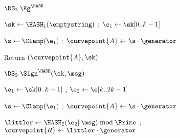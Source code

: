 \begin{figure}
{%
	\begin{algorithm-initial}{$\DS_2.\Kg^{\HASH}$}
		\item $\sk\gets  \HASH_1(\emptystring)$ 
		; $\e_1 \gets \sk[0..k-1]$ 
		\item $\s \gets \Clamp(\e_1)$ ; $\curvepoint{A} \gets \s\cdot \generator$
		\item Return $(\curvepoint{A}, \sk)$
	\end{algorithm-initial}
	\begin{algorithm-subsequent}{$\DS_2.\Sign^{\HASH}(\sk, \msg)$}
		\item $\e_1 \gets \sk[0..k-1]$ ; $\e_2 \gets \e[k..2k-1]$ 
		\item $\s \gets \Clamp(\e_1)$ ; $\curvepoint{A} \gets \s\cdot \generator$
		\item $\littler \gets \HASH_2(\e_2\|\msg) \bmod \Prime$ 
		; $\curvepoint{R} \gets \littler \cdot \generator$

\end{algorithm-subsequent}}
\end{figure}

